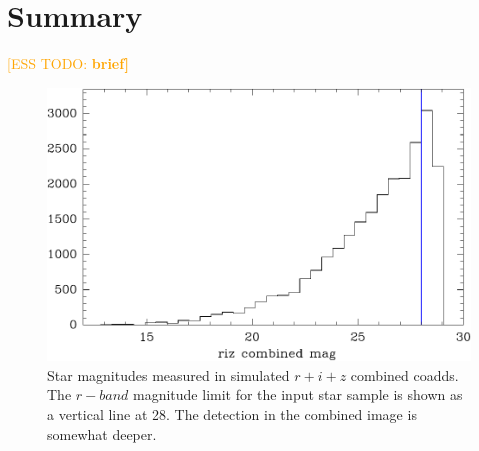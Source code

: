 \documentclass[iop, twocolappendix, appendixfloats, numberedappendix, apj]{hackemulateapj}
\newcommand{\esstodo}[1]{\textcolor{orange}{[ESS TODO: \bf #1]}}
\begin{document}
\section{Summary} \label{sec:summary}

\esstodo{brief}

% 


\begin{figure}
    \includegraphics[width=\columnwidth]{mag-hist.pdf}
    \caption{
        Star magnitudes measured in simulated $r+i+z$ combined coadds.  The
        $r-band$ magnitude limit for the input star sample is shown as a
        vertical line at 28.  The detection in the combined image is
        somewhat deeper.
    }
\end{figure}
\end{document}
